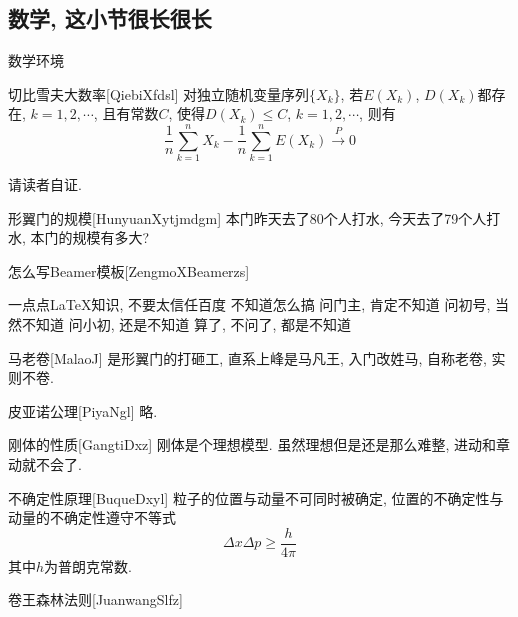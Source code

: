 \documentclass[hyperref, UTF8, CJK, aspectratio=169]{beamer}
\begin{document}
\subsection{数学, 这小节很长很长}
\begin{frame}{数学环境}
	\begin{bittheorem}{切比雪夫大数率}[QiebiXfdsl]
		对独立随机变量序列$\{X_k\}$, 若$E(X_k)$, $D(X_k)$都存在, $k=1,2,\cdots$, 且有常数$C$, 使得$D(X_k)\leq C$, $k=1,2,\cdots$, 则有
		\begin{equation}
		\dfrac{1}{n} \sum_{k=1}^{n} X_k - \dfrac{1}{n} \sum_{k=1}^{n} E(X_k) \stackrel{\;P\;}{\longrightarrow} 0
		\end{equation}
	\end{bittheorem}
	\begin{bitproof}{}
		请读者自证.
	\end{bitproof}
	\begin{bitexample}{形翼门的规模}[HunyuanXytjmdgm]
		本门昨天去了80个人打水, 今天去了79个人打水, 本门的规模有多大?
	\end{bitexample}
	\begin{bitalgorithm}{怎么写Beamer模板}[ZengmoXBeamerzs]
		\begin{algorithmic}[1]
			\REQUIRE 一点点\LaTeX 知识, 不要太信任百度
			\ENSURE 不知道怎么搞
			\STATE 问门主, 肯定不知道
			\STATE 问初号, 当然不知道
			\STATE 问小初, 还是不知道
			\RETURN 算了, 不问了, 都是不知道
		\end{algorithmic}
	\end{bitalgorithm}
	\begin{bitdefinition}{马老卷}[MalaoJ]
		是形翼门的打砸工, 直系上峰是马凡王, 入门改姓马, 自称老卷, 实则不卷.
	\end{bitdefinition}
	\begin{bitaxiom}{皮亚诺公理}[PiyaNgl]
		略.
	\end{bitaxiom}
	\begin{bitproperty}{刚体的性质}[GangtiDxz]
		刚体是个理想模型. 虽然理想但是还是那么难整, 进动和章动就不会了.
	\end{bitproperty}
	\begin{bitproposition}{不确定性原理}[BuqueDxyl]
		粒子的位置与动量不可同时被确定, 位置的不确定性与动量的不确定性遵守不等式
		\begin{equation}
		\Delta x \Delta p \geq \dfrac{h}{4\pi}
		\end{equation}
		其中$h$为普朗克常数.
	\end{bitproposition}
	\begin{bitlemma}{卷王森林法则}[JuanwangSlfz]

\end{bitlemma}
\end{frame}
\end{document}
